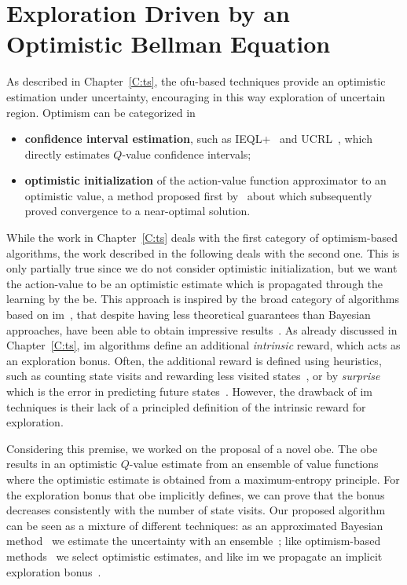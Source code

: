 \chapter{Exploration Driven by an Optimistic Bellman Equation}\label{C:opt}
As described in Chapter~\ref{C:ts}, the \gls{ofu}-based techniques provide an optimistic estimation under uncertainty, encouraging in this way exploration of uncertain region. Optimism can be categorized in
\begin{itemize}
\item \textbf{confidence interval estimation}, such as IEQL+~\cite{meuleau1999exploration} and UCRL~\cite{auer2007logarithmic}, which directly estimates $Q$-value confidence intervals;
 \item \textbf{optimistic initialization} of the action-value function approximator to an optimistic value, a method proposed first by~\cite{sutton1998reinforcement} about which subsequently~\cite{even2002convergence} proved convergence to a near-optimal solution.
\end{itemize}
While the work in Chapter~\ref{C:ts} deals with the first category of optimism-based algorithms, the work described in the following deals with the second one. This is only partially true since we do not consider optimistic initialization, but we want the action-value to be an optimistic estimate which is propagated through the learning by the \gls{be}.
This approach is inspired by the broad category of algorithms based on \gls{im}~\cite{singh2004intrinsically}, that despite having less theoretical guarantees
than Bayesian approaches, have been able to obtain impressive results~\cite{bellemare2016unifying}. As already discussed in Chapter~\ref{C:ts}, \gls{im}
algorithms define an additional \textit{intrinsic} reward, which acts as an exploration bonus. Often, the additional reward is defined using heuristics, such as counting state visits and rewarding less visited states~\cite{ostrovski2017count}, or by \textit{surprise} which is the error in predicting future states~\cite{pathak2017curiosity}. However, the drawback of \gls{im} techniques is their lack of a principled definition of the intrinsic reward for exploration.

Considering this premise, we worked on the proposal of a novel \gls{obe}. The \gls{obe} results in an optimistic $Q$-value estimate
from an ensemble of value functions where the optimistic estimate is obtained from a maximum-entropy principle. For the exploration bonus that \gls{obe} implicitly defines, we can prove that the bonus decreases consistently with the number of
state visits. Our proposed algorithm can be seen as a mixture of
different techniques: as an approximated Bayesian method~\cite{engel2005reinforcement,vlassis2012bayesian} we estimate
the uncertainty with an ensemble~\cite{osband2017deep}; like optimism-based methods~\cite{lai1985asymptotically,kearns2002near,brafman2002r,azizzadenesheli2517efficient} we select
optimistic estimates, and like \gls{im} we propagate an implicit
exploration bonus~\cite{singh2004intrinsically,schmidhuber2008driven,white2010interval}.

